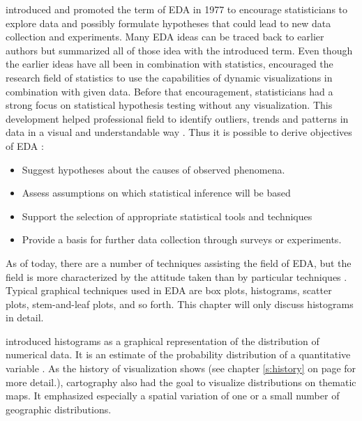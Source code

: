 \citeauthor{Tukey1977} introduced and promoted the term of \ac{EDA} in 1977 to encourage statisticians to explore data and possibly formulate hypotheses that could lead to new data collection and experiments. Many \ac{EDA} ideas can be traced back to earlier authors but \citeauthor{Tukey1977} summarized all of those idea with the introduced term. Even though the earlier ideas have all been in combination with statistics, \citeauthor{Tukey1977} encouraged the research field of statistics to use the capabilities of dynamic visualizations in combination with given data. Before that encouragement, statisticians had a strong focus on statistical hypothesis testing without any visualization. This development helped professional field to identify outliers, trends and patterns in data in a visual and understandable way . Thus it is possible to derive objectives of \ac{EDA} :

\begin{itemize}

\item Suggest hypotheses about the causes of observed phenomena.
\item Assess assumptions on which statistical inference will be based
\item Support the selection of appropriate statistical tools and techniques
\item Provide a basis for further data collection through surveys or experiments.

\end{itemize}

As of today, there are a number of techniques assisting the field of \ac{EDA}, but the field is more characterized by the attitude taken than by particular techniques . Typical graphical techniques used in \ac{EDA} are box plots, histograms, scatter plots, stem-and-leaf plots, and so forth. This chapter will only discuss histograms in detail.

\citeauthor{Pearson1895} introduced histograms as a graphical representation of the distribution of numerical data. It is an estimate of the probability distribution of a quantitative variable . As the history of visualization shows (see chapter \ref{s:history} on page \pageref{s:history} for more detail.), cartography also had the goal to visualize distributions on thematic maps. It emphasized especially a spatial variation of one or a small number of geographic distributions.

